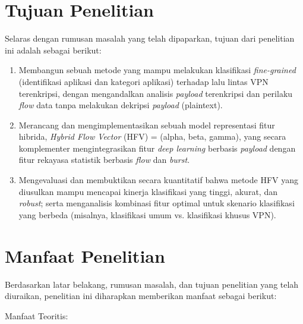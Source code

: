 \section{Tujuan Penelitian}
\label{sec:tujuan_penelitian}
Selaras dengan rumusan masalah yang telah dipaparkan, tujuan dari penelitian ini adalah sebagai berikut:
\begin{enumerate}
    \item Membangun sebuah metode yang mampu melakukan klasifikasi \textit{fine-grained} (identifikasi aplikasi dan kategori aplikasi) terhadap lalu lintas VPN terenkripsi, dengan mengandalkan analisis \textit{payload} terenkripsi dan perilaku \textit{flow} data tanpa melakukan dekripsi \textit{payload} (plaintext).
    
    \item Merancang dan mengimplementasikan sebuah model representasi fitur hibrida, \textit{Hybrid Flow Vector} (HFV) = (alpha, beta, gamma), yang secara komplementer mengintegrasikan fitur \textit{deep learning} berbasis \textit{payload} dengan fitur rekayasa statistik berbasis \textit{flow} dan \textit{burst}.

    \item Mengevaluasi dan membuktikan secara kuantitatif bahwa metode HFV yang diusulkan mampu mencapai kinerja klasifikasi yang tinggi, akurat, dan \textit{robust}; serta menganalisis kombinasi fitur optimal untuk skenario klasifikasi yang berbeda (misalnya, klasifikasi umum vs. klasifikasi khusus VPN).
\end{enumerate}

\section{Manfaat Penelitian}
\label{sec:manfaat_penelitian}
Berdasarkan latar belakang, rumusan masalah, dan tujuan penelitian yang telah diuraikan, penelitian ini diharapkan memberikan manfaat sebagai berikut:

Manfaat Teoritis:

